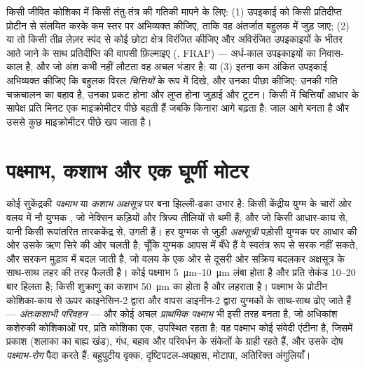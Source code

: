\begin{method}[बहुलकों का आवागमन देखना]\label{met:b3:cytoskeleton-motility:frap}
किसी जीवित कोशिका में किसी तंतु-तंत्र की गतिकी मापने के लिए: (1)
उपइकाई को किसी प्रतिदीप्त प्रोटीन से संलयित करके कम स्तर पर अभिव्यक्त
कीजिए, ताकि वह अंतर्जात बहुलक में जुड़ जाए; (2) या तो किसी तीव्र लेज़र
स्पंद से कोई छोटा क्षेत्र विरंजित कीजिए और अविरंजित उपइकाइयों के भीतर
आते जाने के साथ प्रतिदीप्ति की वापसी फ़िल्माइए (\emph{}, FRAP) --- अर्ध-काल उपइकाइयों का निवास-काल
है, और जो अंश कभी नहीं लौटता वह अचल भंडार है; या (3) इतना कम अंकित
उपइकाई अभिव्यक्त कीजिए कि बहुलक विरल \emph{चित्तियों} के रूप में दिखे,
और उनका पीछा कीजिए: उनकी गति चक्रचालन का बहाव है, उनका प्रकट होना और
लुप्त होना जुड़ाई और टूटन। किसी  में चित्तियाँ आधार के सापेक्ष
प्रति मिनट एक माइक्रोमीटर पीछे बहती हैं जबकि किनारा आगे बढ़ता है: जाल
आगे बनता है और उससे कुछ माइक्रोमीटर पीछे खप जाता है।
\end{method}

\section{पक्ष्माभ, कशाभ और एक घूर्णी मोटर}

\begin{definition}[पक्ष्माभ और कशाभ]\label{def:b3:cytoskeleton-motility:cilia}
कोई सुकेंद्रकी \emph{पक्ष्माभ} या \emph{कशाभ} \emph{अक्षसूत्र} पर बना
झिल्ली-ढका उभार है: किसी केंद्रीय युग्म के चारों ओर वलय में नौ युग्मक
, जो नेक्सिन कड़ियों और त्रिज्य तीलियों से थमी हैं, और
जो किसी आधार-काय से, यानी किसी रूपांतरित तारककेंद्र से, उगती हैं।
हर युग्मक से जुड़ी \emph{अक्षसूत्री } पड़ोसी युग्मक पर आधार की ओर
उसके ऋण सिरे की ओर चलती है; चूँकि युग्मक आपस में बँधे हैं वे स्वतंत्र
रूप से सरक नहीं सकते, और सरकन मुड़ाव में बदल जाती है, जो वलय के एक ओर
से दूसरी ओर सक्रिय  बदलकर अक्षसूत्र के साथ-साथ लहर की तरह फैलती
है। कोई पक्ष्माभ \qtyrange{5}{10}{\micro m} लंबा होता है और प्रति सेकंड
\numrange{10}{20} बार हिलता है; किसी शुक्राणु का कशाभ
\qty{50}{\micro m} का होता है और लहराता है। पक्ष्माभ के प्रोटीन
कोशिका-काय से ऊपर काइनेसिन-2 द्वारा और वापस डाइनीन-2 द्वारा युग्मकों
के साथ-साथ ढोए जाते हैं --- \emph{अंतःकशाभी परिवहन} --- और कोई
अचल \emph{प्राथमिक पक्ष्माभ} भी इसी तरह बनता है, जो अधिकांश कशेरुकी
कोशिकाओं पर, प्रति कोशिका एक, उपस्थित रहता है; वह पक्ष्माभ कोई संवेदी
एंटीना है, जिसमें प्रकाश (शलाका का बाह्य खंड), गंध, बहाव और परिवर्धन के
संकेतों के ग्राही रहते हैं, और उसके दोष \emph{पक्ष्माभ-रोग} पैदा करते
हैं: बहुपुटीय वृक्क, दृष्टिपटल-अपह्रास, मोटापा, अतिरिक्त अंगुलियाँ।
\end{definition}

